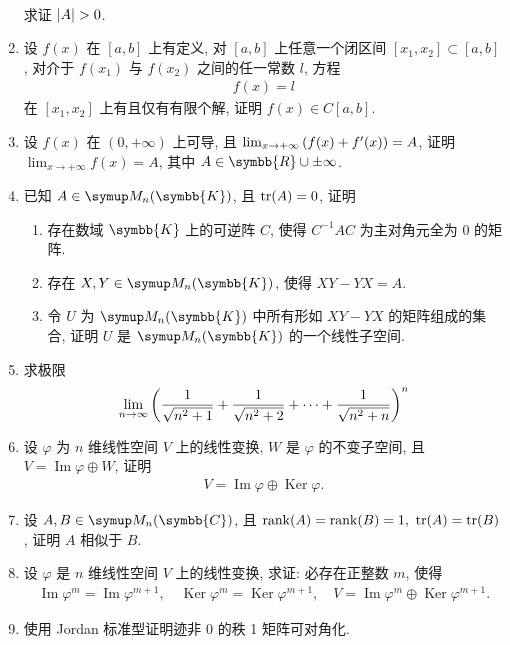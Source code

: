 \documentclass{ctexart}
\newcommand{\limit}[2]{\lim_{#1 \to #2}}
\newcommand{\R}{\ensuremath{\symbb{R}}}
\newcommand{\K}{\ensuremath{\symbb{K}}}
\newcommand{\C}{\ensuremath{\symbb{C}}}
\DeclareMathOperator{\Image}{Im}
\DeclareMathOperator{\Ker}{Ker}
\begin{document}
\begin{enumerate}[series=exer]
\begin{align*}
    \end{align*}   
    求证 $ \abs{A} > 0 $. 
    \item 设 $ f(x) $ 在 $ [a, b] $ 上有定义, 对 $ [a, b] $ 上任意一个闭区间 $ [x_{1}, x_{2}] \subset [a, b] $, 对介于 $ f(x_{1}) $ 与 $ f(x_{2}) $ 之间的任一常数 $ l $, 方程 
    \begin{align*}
        f(x) = l
    \end{align*}
    在 $ [x_{1}, x_{2}] $ 上有且仅有有限个解, 证明 $ f(x) \in C[a, b] $.
    \item 设 $ f(x) $ 在 $ (0, +\infty) $ 上可导, 且 $ \limit{x}{+\infty} \qty(f(x) + f'(x)) = A $, 证明 $ \limit{x}{+\infty} f(x) = A $, 其中 $ A \in \R\cup{\pm\infty} $. 
    \item 已知 $ A \in \MM[\K] $, 且 $ \tr(A) = 0 $, 证明
    \begin{enumerate}
        \item 存在数域 $ \K $ 上的可逆阵 $ C $, 使得 $ C^{-1}AC $ 为主对角元全为 $ 0 $ 的矩阵.
        \item 存在 $ X, Y \in \MM[\K] $, 使得 $ XY - YX = A $.
        \item 令 $ U $ 为 $ \MM[\K] $ 中所有形如 $ XY - YX $ 的矩阵组成的集合, 证明 $ U $ 是 $ \MM[\K] $ 的一个线性子空间. 
    \end{enumerate}
    \item 求极限
    \begin{align*}
        \limit{n}{\infty} \qty(\frac{1}{\sqrt{n^{2} + 1}} + \frac{1}{\sqrt{n^{2} + 2}} + \dots + \frac{1}{\sqrt{n^{2} + n}})^{n}
    \end{align*}
    \item 设 $ \varphi $ 为 $ n $ 维线性空间 $ V $ 上的线性变换, $ W $ 是 $ \varphi $ 的不变子空间, 且 $ V = \Image \varphi \oplus W $, 证明
    \begin{align*}
        V = \Image \varphi \oplus \Ker \varphi.
    \end{align*}
    \item 设 $ A, B \in \MM[\C] $, 且 $ \rank(A) = \rank(B)  = 1,\ \tr(A) = \tr(B) $, 证明 $ A $ 相似于 $ B $.
    \item 设 $ \varphi $ 是 $ n $ 维线性空间 $ V $ 上的线性变换, 求证: 必存在正整数 $ m $, 使得
    \begin{align*}
        \Image \varphi^{m} = \Image \varphi^{m+1},\quad \Ker \varphi^{m} = \Ker \varphi^{m+1}, \quad V = \Image \varphi^{m} \oplus \Ker \varphi^{m+1}.
    \end{align*}
    \item 使用 Jordan 标准型证明迹非 $ 0 $ 的秩 1 矩阵可对角化.

\end{enumerate}
\end{document}
